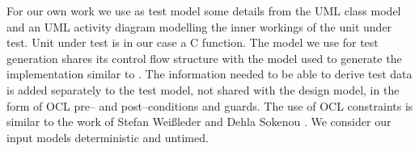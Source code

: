For our own work we use as test model some details from the UML class model and an UML activity diagram modelling the inner workings of the unit under test. Unit under test is in our case a C function. The model we use for test generation shares its control flow structure with the model used to generate the implementation similar to \cite{Linzhang04GeneratingTestCasefromActivityGrayBoxMethod}. The information needed to be able to derive test data is added separately to the test model, not shared with the design model, in the form of OCL pre-- and post--conditions and guards. The use of OCL constraints is similar to the work of Stefan Wei{\ss}leder and Dehla Sokenou \cite{weissleder2008automatic}. We consider our input models deterministic and untimed.%
